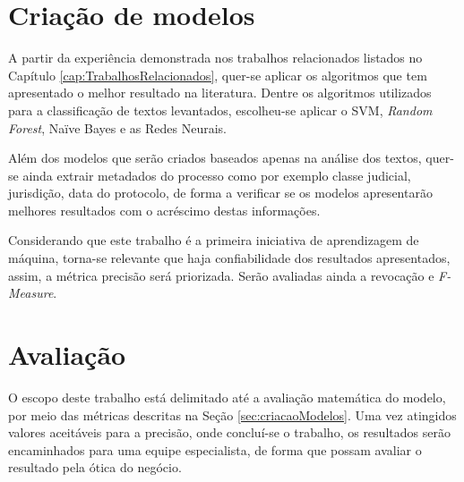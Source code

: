 
\section{\label{sec:criacaoModelos}Criação de modelos}%

A partir da experiência demonstrada nos trabalhos relacionados listados no Capítulo \ref{cap:TrabalhosRelacionados}, quer-se aplicar os algoritmos que tem apresentado o melhor resultado na literatura. Dentre os algoritmos utilizados para a classificação de textos levantados, escolheu-se aplicar o SVM,\textit{ Random Forest}, Naïve Bayes e as Redes Neurais. 

Além dos modelos que serão criados baseados apenas na análise dos textos, quer-se ainda extrair metadados do processo como por exemplo classe judicial, jurisdição, data do protocolo, de forma a verificar se os modelos apresentarão melhores resultados com o acréscimo destas informações.

Considerando que este trabalho é a primeira iniciativa de aprendizagem de máquina, torna-se relevante que haja confiabilidade dos resultados apresentados, assim, a métrica precisão será priorizada. Serão avaliadas ainda a revocação e \textit{F-Measure}.




\section{Avaliação}%
O escopo deste trabalho está delimitado até a avaliação matemática do modelo, por meio das métricas descritas na Seção \ref{sec:criacaoModelos}. Uma vez atingidos valores aceitáveis para a precisão, onde concluí-se o trabalho, os resultados serão encaminhados para uma equipe especialista, de forma que possam avaliar o resultado pela ótica do negócio.


